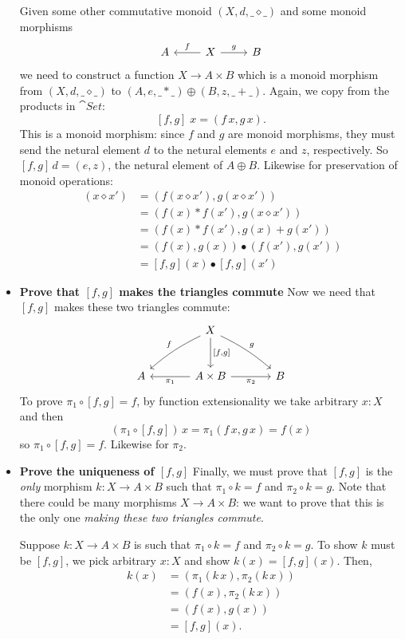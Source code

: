 \begin{Answer}
\begin{itemize}
      Given some other commutative monoid $(X,d,\_\diamond\_)$ and some monoid morphisms
      \[ \begin{tikzcd}  A & X \arrow[swap]{l}{f} \arrow{r}{g} & B \end{tikzcd}  \]
      we need to construct a function $X\to A\times B$ which is a monoid morphism from $(X,d,\_\diamond\_)$ to $(A,e,\_*\_)\oplus(B,z,\_+\_)$. Again, we copy from the products in $\cat{Set}$:
      \[  [f,g]\;x = (f\,x, g\,x). \]
      This is a monoid morphism: since $f$ and $g$ are monoid morphisms, they must send the netural element $d$ to the netural elements $e$ and $z$, respectively. So $[f,g]\,d=(e,z)$, the netural element of $A\oplus B$. Likewise for preservation of monoid operations:
      \begin{align*}
        [f,g]\;(x\diamond x')
          &= (f(x\diamond x'), g(x\diamond x')) \tag{Defn. $[f,g]$}\\
          &= (f(x) * f(x'),g(x\diamond x')) \tag{$f$ is a morphism}\\
          &= (f(x) * f(x'),g(x) + g(x')) \tag{$g$ is a morphism}\\
          &= (f(x),g(x)) \bullet (f(x'),g(x')) \tag{Defn. $\bullet$}\\
          &= [f,g](x) \bullet [f,g](x') \tag{Defn. $[f,g]$}
      \end{align*}
      \item \textbf{Prove that $[f,g]$ makes the triangles commute}
      Now we need that $[f,g]$ makes these two triangles commute:
      \[ \begin{tikzcd}[sep=large]
          & X \arrow[swap,bend right=7]{dl}{f} \arrow[bend left=7]{dr}{g} \arrow{d}{[f,g]}\\
          A & A\times B \arrow{l}{\pi_1}\arrow[swap]{r}{\pi_2} & B
      \end{tikzcd} \]
      To prove $\pi_1\circ [f,g]=f$, by function extensionality we take arbitrary $x:X$ and then
      \[ (\pi_1\circ[f,g])\,x = \pi_1(f\,x, g\,x) = f(x) \]
      so $\pi_1\circ [f,g]=f$. Likewise for $\pi_2$.
      \item \textbf{Prove the uniqueness of $[f,g]$}
      Finally, we must prove that $[f,g]$ is the \emph{only} morphism $k\colon X\to A\times B$ such that $\pi_1\circ k = f$ and $\pi_2\circ k=g$. Note that there could be many morphisms $X\to A\times B$: we want to prove that this is the only one \emph{making these two triangles commute}.
      
      Suppose $k\colon X\to A\times B$ is such that $\pi_1\circ k = f$ and $\pi_2\circ k=g$. To show $k$ must be $[f,g]$, we pick arbitrary $x:X$ and show $k(x)=[f,g](x)$. Then,
      \begin{align*}
        k(x)
          &= (\pi_1(k\,x),\pi_2(k\,x))\\
          &= (f(x),\pi_2(k\,x)) \tag{$\pi_1\circ k=f$}\\
          &= (f(x),g(x)) \tag{$\pi_2\circ k=g$}\\
          &= [f,g](x).
      \end{align*}
    \end{itemize}
\end{Answer}
